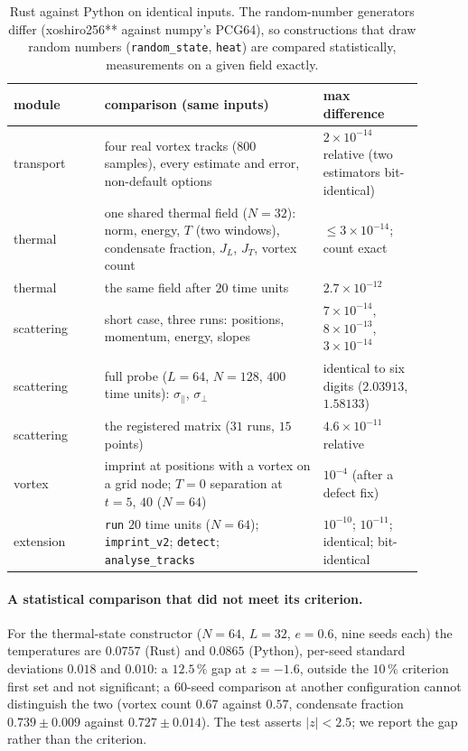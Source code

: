 \documentclass[11pt,a4paper]{article}
\begin{document}
\begin{table}[h]\centering\small
\begin{tabular}{p{0.2\linewidth}p{0.48\linewidth}p{0.22\linewidth}}\toprule
module & comparison (same inputs) & max difference\\\midrule
transport & four real vortex tracks (800 samples), every estimate and error, non-default options & $2\times10^{-14}$ relative (two estimators bit-identical)\\
thermal & one shared thermal field ($N=32$): norm, energy, $T$ (two windows), condensate fraction, $J_L$, $J_T$, vortex count & $\le3\times10^{-14}$; count exact\\
thermal & the same field after $20$ time units & $2.7\times10^{-12}$\\
scattering & short case, three runs: positions, momentum, energy, slopes & $7\times10^{-14}$, $8\times10^{-13}$, $3\times10^{-14}$\\
scattering & full probe ($L=64$, $N=128$, $400$ time units): $\sigma_\parallel$, $\sigma_\perp$ & identical to six digits ($2.03913$, $1.58133$)\\
scattering & the registered matrix ($31$ runs, $15$ points) & $4.6\times10^{-11}$ relative\\
vortex & imprint at positions with a vortex on a grid node; $T=0$ separation at $t=5$, $40$ ($N=64$) & $10^{-4}$ (after a defect fix)\\
extension & \texttt{run} $20$ time units ($N=64$); \texttt{imprint\_v2}; \texttt{detect}; \texttt{analyse\_tracks} & $10^{-10}$; $10^{-11}$; identical; bit-identical\\\bottomrule
\end{tabular}
\caption{Rust against Python on identical inputs. The random-number generators differ (xoshiro256** against numpy's PCG64), so constructions that draw random numbers (\texttt{random\_state}, \texttt{heat}) are compared statistically, measurements on a given field exactly.}\label{tab:cross}
\end{table}

\paragraph{A statistical comparison that did not meet its criterion.} For the thermal-state constructor ($N=64$, $L=32$, $e=0.6$, nine seeds each) the temperatures are $0.0757$ (Rust) and $0.0865$ (Python), per-seed standard deviations $0.018$ and $0.010$: a $12.5\,\%$ gap at $z=-1.6$, outside the $10\,\%$ criterion first set and not significant; a $60$-seed comparison at another configuration cannot distinguish the two
(vortex count $0.67$ against $0.57$, condensate fraction $0.739\pm0.009$ against $0.727\pm0.014$). The test asserts $|z|<2.5$; we report the gap rather than the criterion.
\end{document}
